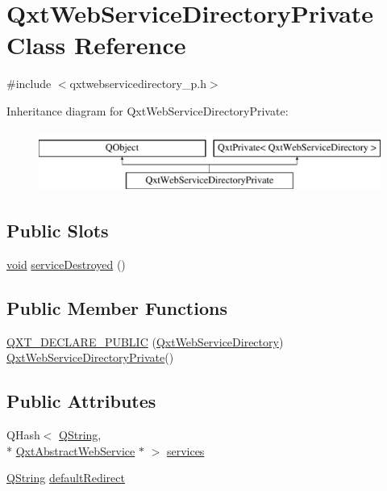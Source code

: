 \hypertarget{class_qxt_web_service_directory_private}{\section{Qxt\-Web\-Service\-Directory\-Private Class Reference}
\label{class_qxt_web_service_directory_private}
}


{\ttfamily \#include $<$qxtwebservicedirectory\-\_\-p.\-h$>$}

Inheritance diagram for Qxt\-Web\-Service\-Directory\-Private\-:\begin{figure}[H]
\begin{center}
\leavevmode
\includegraphics[height=2.000000cm]{class_qxt_web_service_directory_private}
\end{center}
\end{figure}
\subsection*{Public Slots}
\begin{DoxyCompactItemize}
\item 
\hyperlink{group___u_a_v_objects_plugin_ga444cf2ff3f0ecbe028adce838d373f5c}{void} \hyperlink{class_qxt_web_service_directory_private_aa0628cb5760c9d5212aa19f532c52258}{service\-Destroyed} ()
\end{DoxyCompactItemize}
\subsection*{Public Member Functions}
\begin{DoxyCompactItemize}
\item 
\hyperlink{class_qxt_web_service_directory_private_a40eefa4a4e04e9f0f9bd327fa4cecbab}{Q\-X\-T\-\_\-\-D\-E\-C\-L\-A\-R\-E\-\_\-\-P\-U\-B\-L\-I\-C} (\hyperlink{class_qxt_web_service_directory}{Qxt\-Web\-Service\-Directory}) \hyperlink{class_qxt_web_service_directory_private}{Qxt\-Web\-Service\-Directory\-Private}()
\end{DoxyCompactItemize}
\subsection*{Public Attributes}
\begin{DoxyCompactItemize}
\item 
Q\-Hash$<$ \hyperlink{group___u_a_v_objects_plugin_gab9d252f49c333c94a72f97ce3105a32d}{Q\-String}, \\*
\hyperlink{class_qxt_abstract_web_service}{Qxt\-Abstract\-Web\-Service} $\ast$ $>$ \hyperlink{class_qxt_web_service_directory_private_ae9a3285aa545a096b7ce7cc2dd6f23df}{services}
\item 
\hyperlink{group___u_a_v_objects_plugin_gab9d252f49c333c94a72f97ce3105a32d}{Q\-String} \hyperlink{class_qxt_web_service_directory_private_a55fe68689bac4b7705968e8611cd6819}{default\-Redirect}
\end{DoxyCompactItemize}
